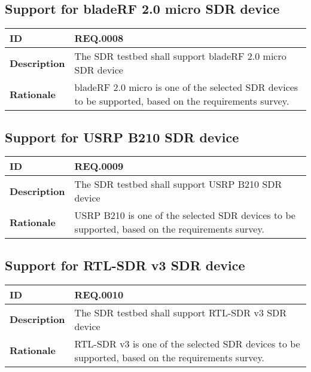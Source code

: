 \documentclass[english,titlepage,a4paper]{report}
\begin{document}
\subsection{Support for bladeRF 2.0 micro SDR device}
\begin{tabular}{|l|p{9cm}|}
  \hline
  \textbf{ID} & REQ.0008 \\
  \hline
  \textbf{Description} &
  The SDR testbed shall support bladeRF 2.0 micro SDR device
  \\
  \hline
  \textbf{Rationale} &
  bladeRF 2.0 micro is one of the selected SDR devices to be supported, based on the requirements survey.
  \\
  \hline
\end{tabular}

\subsection{Support for USRP B210 SDR device}
\begin{tabular}{|l|p{9cm}|}
  \hline
  \textbf{ID} & REQ.0009 \\
  \hline
  \textbf{Description} &
  The SDR testbed shall support USRP B210 SDR device
  \\
  \hline
  \textbf{Rationale} &
  USRP B210 is one of the selected SDR devices to be supported, based on the requirements survey.
  \\
  \hline
\end{tabular}

\subsection{Support for RTL-SDR v3 SDR device}
\begin{tabular}{|l|p{9cm}|}
  \hline
  \textbf{ID} & REQ.0010 \\
  \hline
  \textbf{Description} &
  The SDR testbed shall support RTL-SDR v3 SDR device
  \\
  \hline
  \textbf{Rationale} &
  RTL-SDR v3 is one of the selected SDR devices to be supported, based on the requirements survey.
  \\
  \hline
\end{tabular}
\end{document}
